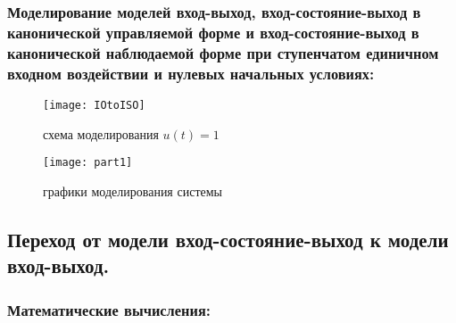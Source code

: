 \subsubsection{Моделирование моделей вход-выход, вход-состояние-выход в канонической управляемой форме и вход-состояние-выход в канонической наблюдаемой форме при ступенчатом единичном входном воздействии и нулевых начальных условиях:}

\begin{figure}[H]
	\begin{center}
		\texttt{[image: IOtoISO]}
		\caption{схема моделирования $u(t) = 1$} 
		\label{pic:pic_1} %
	\end{center}
\end{figure}

\begin{figure}[H]
	\begin{center}
		\texttt{[image: part1]}
		\caption{графики моделирования системы} 
		\label{pic:pic_2} %
	\end{center}
\end{figure}

\subsection{Переход от модели вход-состояние-выход к модели вход-выход.}
\subsubsection{Математические вычисления:}
